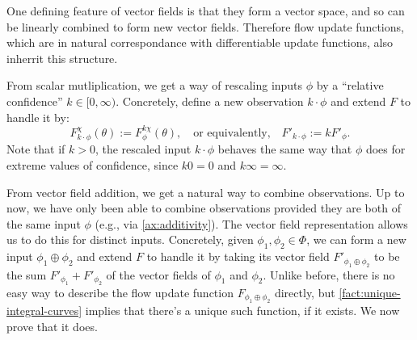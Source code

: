 One defining feature of vector fields is that they
form a vector space, and so
can be linearly combined to form new vector fields.
Therefore flow update functions, which are in natural correspondance
with differentiable update functions, also inherrit this structure.

From scalar mutliplication, we get a way of rescaling
inputs $\phi$ by a ``relative confidence'' $k \in [0,\infty)$.
Concretely,
define a new observation 
$k\cdot\phi$
and extend $F$ to handle it by:
\[
	F^{\chi}_{k\cdot\phi}(\theta) := F^{k\chi}_{\phi}(\theta)
	,\quad\text{or equivalently,}\quad
	F'_{k\cdot \phi} := k F'_{\phi}
	.
\]
Note that if $k > 0$, the rescaled input
$k\cdot \phi$ behaves the same way that $\phi$
does for extreme values of confidence,
since $k 0 = 0$ and $k\infty = \infty$. 



From vector field addition, we get a natural way to combine observations.
Up to now, we have only been able to combine observations provided they are
both of the same input $\phi$ (e.g., via \cref{ax:additivity}).
The vector field representation allows us to do this for distinct inputs. 
Concretely,
given $\phi_1, \phi_2 \in \Phi$, we can form a new input 
$\phi_1 \oplus \phi_2$
and extend $F$ to handle it by taking 
its vector field 
$F'_{\phi_1 \oplus \phi_2}$
to be the sum $F'_{\phi_1} + F'_{\phi_2}$ of the vector fields of $\phi_1 $ and $\phi_2$.
Unlike before, there is no easy way to describe the flow update function
$F_{\phi_1\oplus\phi_2}$ directly,
but \cref{fact:unique-integral-curves} implies that there's a unique
such function, if it exists.
We now prove that it does.


